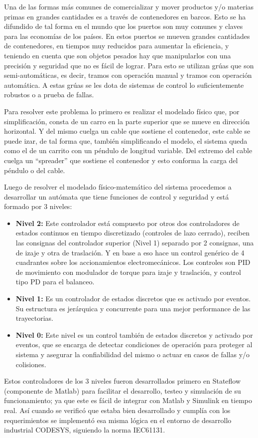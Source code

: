\documentclass[11pt]{article}
\begin{document}
Una de las formas más comunes de comercializar y mover productos y/o materias primas en grandes cantidades es a través de contenedores en barcos. Esto se ha difundido de tal forma en el mundo que los puertos son muy comunes y claves para las economías de los países. En estos puertos se mueven grandes cantidades de contenedores, en tiempos muy reducidos para aumentar la eficiencia, y teniendo en cuenta que son objetos pesados hay que manipularlos con una precisión y seguridad que no es fácil de lograr. Para esto se utilizan grúas que son semi-automáticas, es decir, tramos con operación manual y tramos con operación automática. A estas grúas se les dota de sistemas de control lo suficientemente robustos o a prueba de fallas.
\par
Para resolver este problema lo primero es realizar el modelado físico que, por simplificación, consta de un carro en la parte superior que se mueve en dirección horizontal. Y del mismo cuelga  un cable que sostiene el contenedor, este cable se puede izar, de tal forma que, también simplificando el modelo, el sistema queda como el de un carrito con un péndulo de longitud variable. Del extremo del cable cuelga un “spreader” que sostiene el contenedor y esto conforma la carga del péndulo o del cable.
\par
Luego de resolver el modelado físico-matemático del sistema procedemos a desarrollar un autómata que tiene funciones de control y seguridad y está formado por 3 niveles:
\begin{itemize}
    \item \textbf{Nivel 2:} Este controlador está compuesto por otros dos controladores de estados continuos en tiempo discretizado (controles de lazo cerrado), reciben las consignas del controlador superior (Nivel 1) separado por 2 consignas, una de izaje y otra de traslación. Y en base a eso hace un control genérico de 4 cuadrantes sobre los accionamientos electromecánicos. Los controles son PID de movimiento con modulador de torque para izaje y traslación, y control tipo PD para el balanceo.
    \item \textbf{Nivel 1:} Es un controlador de estados discretos que es activado por eventos. Su estructura es jerárquica y concurrente para una mejor performance de las trayectorias. 
    \item \textbf{Nivel 0:} Este nivel es un control también de estados discretos y activado por eventos, que se encarga de detectar condiciones de operación para proteger al sistema y asegurar la confiabilidad del mismo o actuar en casos de fallas y/o colisiones.
\end{itemize}
\par
Estos controladores de los 3 niveles fueron desarrollados primero en Stateflow (componente de Matlab) para facilitar el desarrollo, testeo y simulación de su funcionamiento; ya que este es fácil de integrar con Matlab y Simulink en tiempo real. Así cuando se verificó que estaba bien desarrollado y cumplía con los requerimientos se implementó esa misma lógica en el entorno de desarrollo industrial CODESYS, siguiendo la norma IEC61131.
\end{document}
